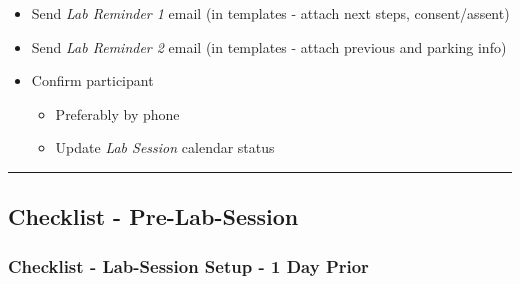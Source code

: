 \documentclass[]{book}
\providecommand{\tightlist}{%
  \setlength{\itemsep}{0pt}\setlength{\parskip}{0pt}}
\begin{document}
\begin{itemize}
\tightlist
\item
  Send \emph{Lab Reminder 1} email (in templates - attach next steps, consent/assent)
\item
  Send \emph{Lab Reminder 2} email (in templates - attach previous and parking info)
\item
  Confirm participant

  \begin{itemize}
  \tightlist
  \item
    Preferably by phone
  \item
    Update \emph{Lab Session} calendar status
  \end{itemize}
\end{itemize}

\begin{center}\rule{0.5\linewidth}{0.5pt}\end{center}

\hypertarget{checklist---pre-lab-session}{%
\subsection{Checklist - Pre-Lab-Session}\label{checklist---pre-lab-session}}

\hypertarget{checklist---lab-session-setup---1-day-prior}{%
\subsubsection{Checklist - Lab-Session Setup - 1 Day Prior}\label{checklist---lab-session-setup---1-day-prior}}
\end{document}
